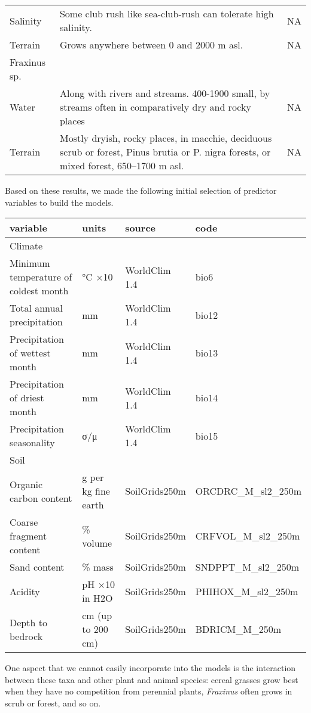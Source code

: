\documentclass[]{article}
\begin{document}
\begin{longtable}{llc}
Salinity & Some club rush like sea-club-rush can tolerate high salinity. & NA \\ 
Terrain & Grows anywhere between 0 and 2000 m asl. & NA \\ 
\midrule
\multicolumn{1}{l}{Fraxinus sp.} \\ 
\midrule
Water & Along with rivers and streams. 400-1900 small, by streams often in comparatively dry and rocky places & NA \\ 
Terrain & Mostly dryish, rocky places, in macchie, deciduous scrub or forest, Pinus brutia or P. nigra forests, or mixed forest, 650–1700 m asl. & NA \\ 
\bottomrule
\end{longtable}

Based on these results, we made the following initial selection of
predictor variables to build the models.

\captionsetup[table]{labelformat=empty,skip=1pt}
\begin{longtable}{llll}
\toprule
variable & units & source & code \\ 
\midrule
\multicolumn{1}{l}{Climate} \\ 
\midrule
Minimum temperature of coldest month & °C ×10 & WorldClim 1.4 & bio6 \\ 
Total annual precipitation & mm & WorldClim 1.4 & bio12 \\ 
Precipitation of wettest month & mm & WorldClim 1.4 & bio13 \\ 
Precipitation of driest month & mm & WorldClim 1.4 & bio14 \\ 
Precipitation seasonality & σ/μ & WorldClim 1.4 & bio15 \\ 
\midrule
\multicolumn{1}{l}{Soil} \\ 
\midrule
Organic carbon content & g per kg fine earth & SoilGrids250m & ORCDRC\_M\_sl2\_250m \\ 
Coarse fragment content & \% volume & SoilGrids250m & CRFVOL\_M\_sl2\_250m \\ 
Sand content & \% mass & SoilGrids250m & SNDPPT\_M\_sl2\_250m \\ 
Acidity & pH ×10 in H2O & SoilGrids250m & PHIHOX\_M\_sl2\_250m \\ 
Depth to bedrock & cm (up to 200 cm) & SoilGrids250m & BDRICM\_M\_250m \\ 
\bottomrule
\end{longtable}

One aspect that we cannot easily incorporate into the models is the
interaction between these taxa and other plant and animal species:
cereal grasses grow best when they have no competition from perennial
plants, \emph{Fraxinus} often grows in scrub or forest, and so on.
\end{document}
